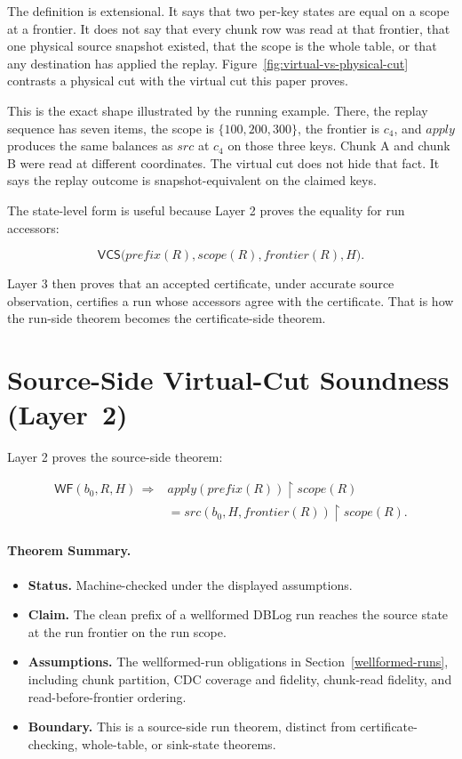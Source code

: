 \documentclass[letterpaper,10pt,twocolumn]{article}
\newcommand{\restrict}{\mathbin{\upharpoonright}}
\newcommand{\Apply}{\mathit{apply}}
\newcommand{\Src}{\mathit{src}}
\newcommand{\Scope}{\mathit{scope}}
\newcommand{\Frontier}{\mathit{frontier}}
\newcommand{\CleanPrefix}{\mathit{prefix}}
\newcommand{\WF}{\mathsf{WF}}
\newcommand{\VCS}{\mathsf{VCS}}
\providecommand{\tightlist}{\setlength{\itemsep}{0pt}\setlength{\parskip}{0pt}}
\begin{document}
The definition is extensional. It says that two per-key
states are equal on a scope at a frontier. It does not say that every
chunk row was read at that frontier, that one physical source snapshot
existed, that the scope is the whole table, or that any destination has
applied the replay.
Figure~\ref{fig:virtual-vs-physical-cut} contrasts a physical cut with
the virtual cut this paper proves.

\begin{figure}[ht]
  
\end{figure}

This is the exact shape illustrated by the running example. There, the
replay sequence has seven items, the scope is
$\{100,200,300\}$, the frontier is $c_4$, and
$\Apply$ produces the same balances as $\Src$ at $c_4$
on those three keys. Chunk A and chunk B were read at different
coordinates. The virtual cut does not hide that fact. It says the replay
outcome is snapshot-equivalent on the claimed keys.

The state-level form is useful because Layer 2 proves the equality for
run accessors:

\[
  \VCS\bigl(\CleanPrefix(R),\Scope(R),\Frontier(R),H\bigr).
\]

Layer 3 then proves that an accepted certificate, under accurate source
observation, certifies a run whose accessors agree with the certificate.
That is how the run-side theorem becomes the certificate-side theorem.

\section{Source-Side Virtual-Cut Soundness \mbox{(Layer 2)}}\label{source-side-virtual-cut-soundness-layer-2}

Layer 2 proves the source-side theorem:

\[
\begin{aligned}
  \WF(b_0,R,H) \,\Longrightarrow{}&
    \Apply(\CleanPrefix(R)) \restrict \Scope(R)\\
  &{}= \Src(b_0,H,\Frontier(R)) \restrict \Scope(R).
\end{aligned}
\]

\paragraph*{Theorem Summary.}
\begin{itemize}
\tightlist
\item
  \textbf{Status.} Machine-checked under the displayed
  assumptions.
\item
  \textbf{Claim.} The clean prefix of a wellformed DBLog run reaches the
  source state at the run frontier on the run scope.
\item
  \textbf{Assumptions.} The wellformed-run obligations in
  Section~\ref{wellformed-runs},
  including chunk partition, CDC coverage and fidelity, chunk-read
  fidelity, and read-before-frontier ordering.
\item
  \textbf{Boundary.} This is a source-side run theorem, distinct from
  certificate-checking, whole-table, or sink-state theorems.
\end{itemize}
\end{document}
